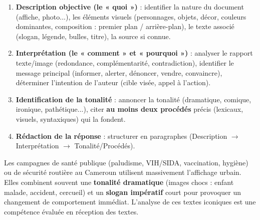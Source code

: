\documentclass[11pt]{article}
\begin{document}
\begin{methode}
\begin{enumerate}
\item \textbf{Description objective (le « quoi »)} : identifier la nature du document (affiche, photo...), les éléments visuels (personnages, objets, décor, couleurs dominantes, composition : premier plan / arrière-plan), le texte associé (slogan, légende, bulles, titre), la source si connue.
\item \textbf{Interprétation (le « comment » et « pourquoi »)} : analyser le rapport texte/image (redondance, complémentarité, contradiction), identifier le message principal (informer, alerter, dénoncer, vendre, convaincre), déterminer l'intention de l'auteur (cible visée, appel à l'action).
\item \textbf{Identification de la tonalité} : annoncer la tonalité (dramatique, comique, ironique, pathétique...), citer \textbf{au moins deux procédés} précis (lexicaux, visuels, syntaxiques) qui la fondent.
\item \textbf{Rédaction de la réponse} : structurer en paragraphes (Description $\rightarrow$ Interprétation $\rightarrow$ Tonalité/Procédés).
\end{enumerate}
\end{methode}

\begin{savaistu}
Les campagnes de santé publique (paludisme, VIH/SIDA, vaccination, hygiène) ou de sécurité routière au Cameroun utilisent massivement l'affichage urbain. Elles combinent souvent une \textbf{tonalité dramatique} (images chocs : enfant malade, accident, cercueil) et un \textbf{slogan impératif} court pour provoquer un changement de comportement immédiat. L'analyse de ces textes iconiques est une compétence évaluée en réception des textes.
\end{savaistu}
\end{document}
